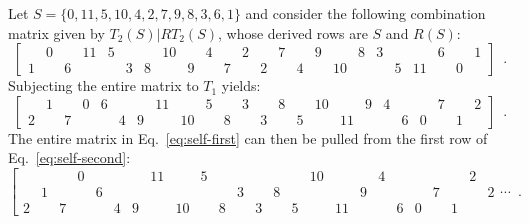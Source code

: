 \begin{example}
    \cite[221]{Starr1984}
    \label{self-folded}
    Let $S = \{ 0, 11, 5, 10, 4, 2, 7, 9, 8, 3, 6, 1 \}$ and consider the following combination matrix given by $T_2(S) | RT_2(S)$, whose derived rows are $S$ and $R(S)$:
    \begin{equation}
        \label{eq:self-first}
        \left[
        \begin{array}{cccccccccccc|cccccccccccc}
            & 0 && 11 & 5 &&& 10 && 4 && 2 && 7 && 9 && 8 & 3 &&& 6 && 1 \\
            1 && 6 &&& 3 & 8 && 9 && 7 && 2 && 4 && 10 &&& 5 & 11 && 0 &
        \end{array}
        \right] \enspace.
    \end{equation}
    Subjecting the entire matrix to $T_1$ yields:
    \begin{equation}
        \label{eq:self-second}
        \left[
        \begin{array}{cccccccccccc|cccccccccccc}
            & 1 && 0 & 6 &&& 11 && 5 && 3 && 8 && 10 && 9 & 4 &&& 7 && 2 \\
            2 && 7 &&& 4 & 9 && 10 && 8 && 3 && 5 && 11 &&& 6 & 0 && 1 &
        \end{array}
        \right] \enspace.
    \end{equation}
    The entire matrix in Eq.~\ref{eq:self-first} can then be pulled from the first row of Eq.~\ref{eq:self-second}:
    \begin{equation}
        \left[
        \begin{array}{cccccccccccc|cccccccccccc|c}
            &&& 0 &&&& 11 && 5 &&&&&& 10 &&& 4 &&&&& 2 & \\
            & 1 &&& 6 &&&&&&& 3 && 8 &&&& 9 &&&& 7 &&& 2 \\
            2 && 7 &&& 4 & 9 && 10 && 8 && 3 && 5 && 11 &&& 6 & 0 && 1 &&
        \end{array}
        \cdots \right. \enspace.
    \end{equation}
\end{example}

